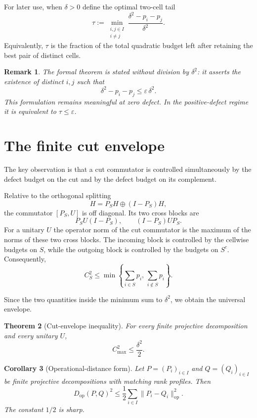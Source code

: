 \documentclass[11pt]{article}
\newtheorem{theorem}{Theorem}[section]
\newtheorem{corollary}[theorem]{Corollary}
\newtheorem{remark}[theorem]{Remark}
\newcommand{\op}{\mathrm{op}}
\newcommand{\cmax}{C_{\max}}
\newcommand{\dd}{\delta}
\newcommand{\tauq}{\tau}
\begin{document}
For later use, when $\dd>0$ define the optimal two-cell tail
\begin{equation}\label{eq:tau}
  \tauq:=
  \min_{\substack{i,j\in I\\i\neq j}}
  \frac{\dd^2-p_i-p_j}{\dd^2}.
\end{equation}
Equivalently, $\tauq$ is the fraction of the total quadratic budget left after
retaining the best pair of distinct cells.

\begin{remark}
The formal theorem is stated without division by $\dd^2$: it asserts the
existence of distinct $i,j$ such that
\[
  \dd^2-p_i-p_j\le \varepsilon\,\dd^2.
\]
This formulation remains meaningful at zero defect.  In the positive-defect
regime it is equivalent to $\tauq\le\varepsilon$.
\end{remark}

\section{The finite cut envelope}

The key observation is that a cut commutator is controlled simultaneously by
the defect budget on the cut and by the defect budget on its complement.

Relative to the orthogonal splitting
\[
  H=P_SH\oplus (I-P_S)H,
\]
the commutator $[P_S,U]$ is off diagonal.  Its two cross blocks are
\[
  P_SU(I-P_S),
  \qquad
  (I-P_S)UP_S.
\]
For a unitary $U$ the operator norm of the cut commutator is the maximum of
the norms of these two cross blocks.  The incoming block is controlled by the
cellwise budgets on $S$, while the outgoing block is controlled by the
budgets on $S^c$.  Consequently,
\begin{equation}\label{eq:cut-min}
  C_S^2
  \le
  \min\left\{
    \sum_{i\in S}p_i,\,
    \sum_{i\notin S}p_i
  \right\}.
\end{equation}

Since the two quantities inside the minimum sum to $\dd^2$, we obtain the
universal envelope.

\begin{theorem}[Cut-envelope inequality]\label{thm:envelope}
For every finite projective decomposition and every unitary $U$,
\[
  \boxed{\cmax^2\le\frac{\dd^2}{2}}.
\]
\end{theorem}

\begin{corollary}[Operational-distance form]\label{cor:operational-distance}
Let $P=(P_i)_{i\in I}$ and $Q=(Q_i)_{i\in I}$ be finite projective
decompositions with matching rank profiles.  Then
\[
  \boxed{
  D_{\mathrm{op}}(P,Q)^2
  \le
  \frac12\sum_{i\in I}\|P_i-Q_i\|_{\op}^2.
  }
\]
The constant $1/2$ is sharp.
\end{corollary}
\end{document}
